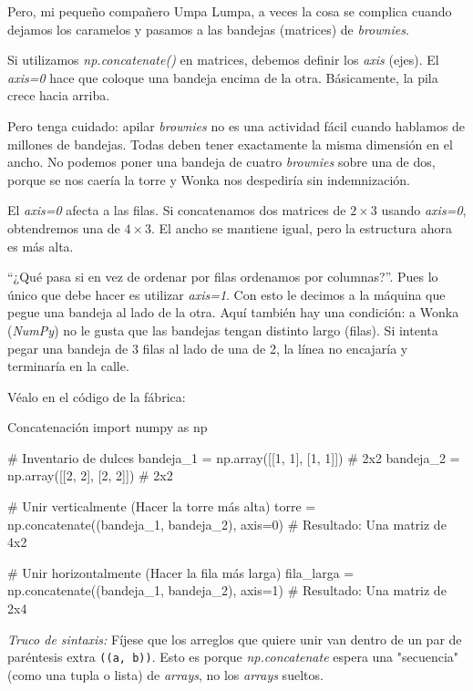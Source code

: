Pero, mi pequeño compañero Umpa Lumpa, a veces la cosa se complica cuando dejamos los caramelos y pasamos a las bandejas (matrices) de \textit{brownies}.

Si utilizamos \textit{np.concatenate()} en matrices, debemos definir los \textit{axis} (ejes). El \textit{axis=0} hace que coloque una bandeja encima de la otra. Básicamente, la pila crece hacia arriba.

Pero tenga cuidado: apilar \textit{brownies} no es una actividad fácil cuando hablamos de millones de bandejas. Todas deben tener exactamente la misma dimensión en el ancho. No podemos poner una bandeja de cuatro \textit{brownies} sobre una de dos, porque se nos caería la torre y Wonka nos despediría sin indemnización.

\begin{nota}
    El \textit{axis=0} afecta a las filas. Si concatenamos dos matrices de \(2 \times 3\) usando \textit{axis=0}, obtendremos una de \(4\times 3\). El ancho se mantiene igual, pero la estructura ahora es más alta.
\end{nota}

``¿Qué pasa si en vez de ordenar por filas ordenamos por columnas?''. Pues lo único que debe hacer es utilizar \textit{axis=1}. Con esto le decimos a la máquina que pegue una bandeja al lado de la otra. Aquí también hay una condición: a Wonka (\textit{NumPy}) no le gusta que las bandejas tengan distinto largo (filas). Si intenta pegar una bandeja de 3 filas al lado de una de 2, la línea no encajaría y terminaría en la calle.

Véalo en el código de la fábrica:

\begin{pycode}{Concatenación}
import numpy as np

# Inventario de dulces
bandeja_1 = np.array([[1, 1], [1, 1]]) # 2x2
bandeja_2 = np.array([[2, 2], [2, 2]]) # 2x2

# Unir verticalmente (Hacer la torre más alta)
torre = np.concatenate((bandeja_1, bandeja_2), axis=0) # Resultado: Una matriz de 4x2

# Unir horizontalmente (Hacer la fila más larga)
fila_larga = np.concatenate((bandeja_1, bandeja_2), axis=1) # Resultado: Una matriz de 2x4
\end{pycode}

\begin{nota}
    \textit{Truco de sintaxis:} Fíjese que los arreglos que quiere unir van dentro de un par de paréntesis extra \texttt{((a, b))}. Esto es porque \textit{np.concatenate} espera una "secuencia" (como una tupla o lista) de \textit{arrays}, no los \textit{arrays} sueltos.
\end{nota}

